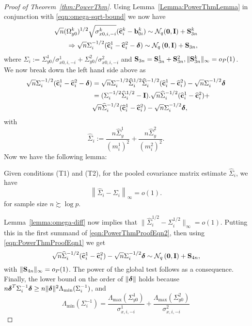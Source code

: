 \begin{proof}[Proof of Theorem~\ref{thm:PowerThm}]
Using Lemma~\ref{Lemma:PowerThmLemma} in conjunction with \eqref{eqn:omega-sqrt-bound} we now have
%
\begin{align}
\sqrt n (\Omega_{y0}^k)^{1/2} \sqrt{\sigma_{x0,i,-i}^k} (\widehat {{\bf{c}}}_i^k - {\bf{b}}_{0i}^k)  \sim
{\cal{N}}_q ( {\bf 0}, {\mathbf{I}}) + {\mathbf{S}}_{3n}^k \notag\\
\Rightarrow \sqrt n \Sigma_i^{-1/2} (\widehat {{\bf{c}}}_i^1 - \widehat {{\bf{c}}}_i^2 - {\boldsymbol{\delta}}) \sim
{\cal{N}}_q \left( {\bf 0}, {\mathbf{I}} \right) + {\mathbf{S}}_{3n},
\label{eqn:PowerThmProofEqn1}
\end{align}
%
where $\Sigma_i := \Sigma_{y0}^1/ \sigma_{x0,i,-i}^1 + \Sigma_{y0}^2/ \sigma_{x0,i,-i}^2$ and ${\mathbf{S}}_{3n} = {\mathbf{S}}_{3n}^1 + {\mathbf{S}}_{3n}^2, \|{\mathbf{S}}_{3n}^k\|_\infty = o_P(1)$. We now break down the left hand side above as
%
\begin{align}
\sqrt n \Sigma_i^{-1/2} (\widehat {{\bf{c}}}_i^1 - \widehat {{\bf{c}}}_i^2 - {\boldsymbol{\delta}}) &=
\sqrt n \Sigma_i^{-1/2} \widehat \Sigma_i^{1/2} \widehat \Sigma_i^{-1/2} (\widehat {{\bf{c}}}_i^1 - \widehat {{\bf{c}}}_i^2) - \sqrt n \Sigma_i^{-1/2} {\boldsymbol{\delta}} \notag\\
&= (\Sigma_i^{-1/2} \widehat \Sigma_i^{1/2} - {\mathbf{I}}) . \sqrt n \widehat \Sigma_i^{-1/2} (\widehat {{\bf{c}}}_i^1 - \widehat {{\bf{c}}}_i^2) + \notag\\
& \sqrt n \widehat \Sigma_i^{-1/2} (\widehat {{\bf{c}}}_i^1 - \widehat {{\bf{c}}}_i^2) - \sqrt n \Sigma_i^{-1/2} {\boldsymbol{\delta}},
\label{eqn:PowerThmProofEqn2}
\end{align}
%
with
%
$$
\widehat \Sigma_i :=
\frac{ n \widehat \Sigma_y^1}{(m_i^1)^2} + \frac{n \widehat \Sigma_y^2}{(m_i^2)^2}.
$$
%
Now we have the following lemma:
%
\begin{Lemma}\label{Lemma:PowerThmLemma2}
Given conditions (T1) and (T2), for the pooled covariance matrix estimate $\widehat \Sigma_i$, we have
%
$$
\left\| \widehat \Sigma_i - \Sigma_i \right\|_\infty = o(1).
$$
%
for sample size $n \succsim \log p$.
\end{Lemma}
%
Lemma~\ref{lemma:omega-diff} now implies that $\| \widehat \Sigma_i^{1/2} - \Sigma_i^{1/2} \|_\infty = o(1)$. Putting this in the first summand of \eqref{eqn:PowerThmProofEqn2}, then using \eqref{eqn:PowerThmProofEqn1} we get
%
$$
\sqrt n \widehat \Sigma_i^{-1/2} (\widehat {{\bf{c}}}_i^1 - \widehat {{\bf{c}}}_i^2) - \sqrt n \Sigma_i^{-1/2} {\boldsymbol{\delta}}
\sim {\cal{N}}_q \left( {\bf 0}, {\mathbf{I}} \right) + {\mathbf{S}}_{4n},
$$
%
with $\| {\mathbf{S}}_{4n} \|_\infty = o_P(1)$. The power of the global test follows as a consequence. Finally, the lower bound on the order of $\| {\boldsymbol{\delta}} \|$ holds because $n {\boldsymbol{\delta}}^T \Sigma_i^{-1} {\boldsymbol{\delta}} \geq n \| {\boldsymbol{\delta}} \|^2 \Lambda_{\min} (\Sigma_i^{-1}) $, and
%
$$
\Lambda_{\min} (\Sigma_i^{-1}) = \frac{ \Lambda_{\max} (\Sigma_{y0}^1)}{\sigma_{x,i,-i}^1} +
\frac{ \Lambda_{\max} (\Sigma_{y0}^2)}{\sigma_{x,i,-i}^2}
$$
%
\end{proof}

